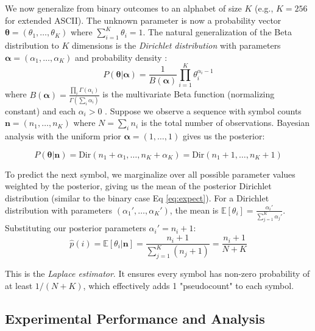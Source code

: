 \documentclass[11pt,a4paper]{article}
\theoremstyle{definition} %
\begin{document}
We now generalize from binary outcomes to an alphabet of size $K$ (e.g., $K=256$ for extended ASCII). The unknown parameter is now a probability vector $\boldsymbol{\theta} = (\theta_1, \dots, \theta_K)$ where $\sum_{i=1}^K \theta_i = 1$. The natural generalization of the Beta distribution to $K$ dimensions is the \textit{Dirichlet distribution} \cite[pg 317]{mackay} with parameters $\boldsymbol{\alpha} = (\alpha_1, \dots, \alpha_K)$ and probability density \cite[Eq. 23.30]{mackay}:
\begin{equation}
    P(\boldsymbol{\theta} | \boldsymbol{\alpha}) = \frac{1}{B(\boldsymbol{\alpha})} \prod_{i=1}^K \theta_i^{\alpha_i - 1}
\end{equation}
where $B(\boldsymbol{\alpha}) = \frac{\prod_i \Gamma(\alpha_i)}{\Gamma(\sum_i \alpha_i)}$ is the multivariate Beta function (normalizing constant) and each $\alpha_i > 0$ \cite{tsun2025}. Suppose we observe a sequence with symbol counts $\mathbf{n} = (n_1, \dots, n_K)$ where $N = \sum_i n_i$ is the total number of observations. Bayesian analysis with the uniform prior  $\boldsymbol{\alpha} = (1, \dots, 1)$ gives us the posterior:

\begin{equation}
    P(\boldsymbol{\theta} | \mathbf{n}) = \text{Dir}( n_1 + \alpha_1, \dots, n_K + \alpha_K) = \text{Dir}(n_1 + 1, \dots, n_K + 1)
\end{equation}

To predict the next symbol, we marginalize over all possible parameter values weighted by the posterior, giving us the mean of the posterior Dirichlet distribution (similar to the binary case Eq \ref{eq:expect}). For a Dirichlet distribution with parameters $(\alpha_1', \dots, \alpha_K')$, the mean is \cite[Eq. 23.32]{mackay} $\mathbb{E}[\theta_i] = \frac{\alpha_i'}{\sum_{j=1}^K \alpha_j'}$. Substituting our posterior parameters $\alpha_i' = n_i + 1$:
\begin{equation}
    \hat{p}(i) = \mathbb{E}[\theta_i | \mathbf{n}] = \frac{n_i + 1}{\sum_{j=1}^K (n_j + 1)} = \frac{n_i + 1}{N + K}
\end{equation}

This is the \textit{Laplace estimator}. It ensures every symbol has non-zero probability of at least $1/(N+K)$, which effectively adds 1 "pseudocount" to each symbol.

\subsection{Experimental Performance and Analysis}
\end{document}
